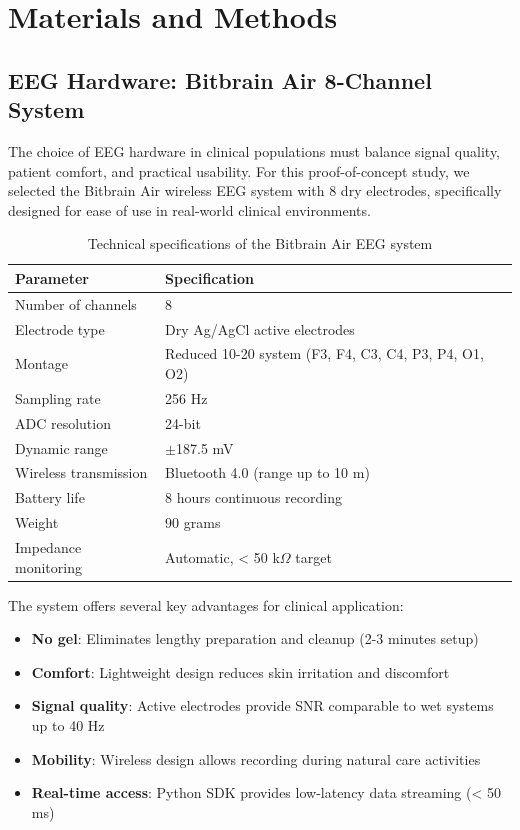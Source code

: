 \section{Materials and Methods}

\subsection{EEG Hardware: Bitbrain Air 8-Channel System}

The choice of EEG hardware in clinical populations must balance signal quality, patient comfort, and practical usability. For this proof-of-concept study, we selected the Bitbrain Air wireless EEG system with 8 dry electrodes, specifically designed for ease of use in real-world clinical environments.

\begin{table}[H]
\centering
\caption{Technical specifications of the Bitbrain Air EEG system}
\label{tab:hardware}
\begin{tabular}{@{}ll@{}}
\toprule
\textbf{Parameter} & \textbf{Specification} \\
\midrule
Number of channels & 8 \\
Electrode type & Dry Ag/AgCl active electrodes \\
Montage & Reduced 10-20 system (F3, F4, C3, C4, P3, P4, O1, O2) \\
Sampling rate & 256 Hz \\
ADC resolution & 24-bit \\
Dynamic range & $\pm$187.5 mV \\
Wireless transmission & Bluetooth 4.0 (range up to 10 m) \\
Battery life & 8 hours continuous recording \\
Weight & 90 grams \\
Impedance monitoring & Automatic, < 50 k$\Omega$ target \\
\bottomrule
\end{tabular}
\end{table}

The system offers several key advantages for clinical application:

\begin{itemize}
    \item \textbf{No gel}: Eliminates lengthy preparation and cleanup (2-3 minutes setup)
    \item \textbf{Comfort}: Lightweight design reduces skin irritation and discomfort
    \item \textbf{Signal quality}: Active electrodes provide SNR comparable to wet systems up to 40 Hz
    \item \textbf{Mobility}: Wireless design allows recording during natural care activities
    \item \textbf{Real-time access}: Python SDK provides low-latency data streaming (< 50 ms)
\end{itemize}

